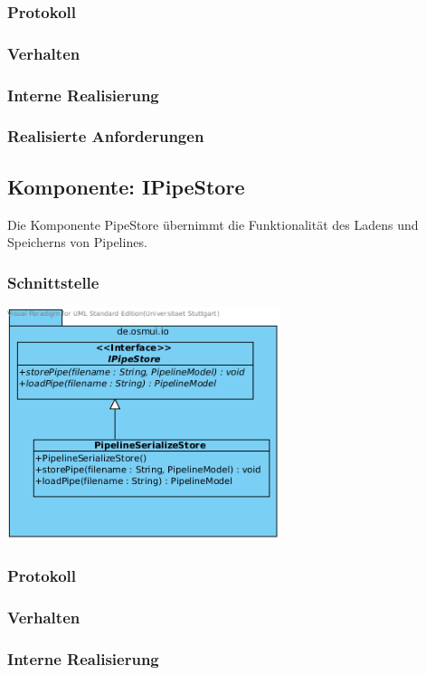 \documentclass[a4paper,12pt]{scrartcl}
\begin{document}
\subsubsection{Protokoll}
\subsubsection{Verhalten}
\subsubsection{Interne Realisierung}
\subsubsection{Realisierte Anforderungen}

\subsection{Komponente: IPipeStore}
Die Komponente PipeStore übernimmt die Funktionalität des Ladens und Speicherns von Pipelines.
\subsubsection{Schnittstelle}
\begin{center}
\includegraphics[width=8cm]{Schnittstelle_IPipeStore.png}
\end{center}
\subsubsection{Protokoll}
\subsubsection{Verhalten}
\subsubsection{Interne Realisierung}
\end{document}

